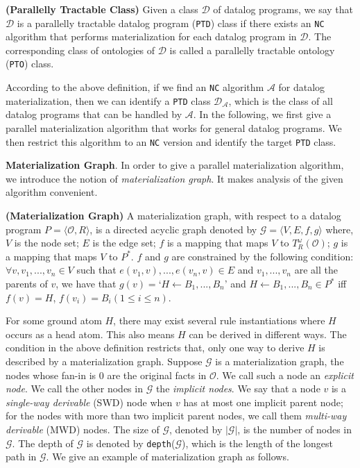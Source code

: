 \documentclass{article}
\begin{document}
\begin{definition}\label{def:ptd}
\textbf{(Parallelly Tractable Class)} Given a class $\mathcal{D}$ of datalog programs,
we say that $\mathcal{D}$ is a parallelly tractable datalog program (\texttt{PTD}) class if there exists an \texttt{NC} algorithm that performs materialization for each datalog program in $\mathcal{D}$. The corresponding class of ontologies of $\mathcal{D}$ is called a parallelly tractable ontology (\texttt{PTO}) class.
\end{definition}

According to the above definition, if we find an \texttt{NC} algorithm $\mathcal{A}$ for datalog materialization, then
we can identify a \texttt{PTD} class $\mathcal{D}_{\mathcal{A}}$, which is the class of all datalog programs
that can be handled by $\mathcal{A}$. In the following, we first give a parallel materialization algorithm that works for general datalog programs. We then restrict this algorithm to an \texttt{NC} version and identify the target \texttt{PTD} class.

\textbf{Materialization Graph}. In order to give a parallel materialization algorithm, we introduce the notion of \emph{materialization graph}. It makes analysis of the given algorithm convenient.

\begin{definition}
\textbf{(Materialization Graph)}\label{def:mg} A materialization graph, with respect to
a datalog program $P=\langle\mathcal{O}, R\rangle$, is a directed acyclic graph
denoted by $\mathcal{G}=\langle V, E, f, g\rangle$ where,$V$ is the node set;
$E$ is the edge set; $f$ is a mapping that maps $V$ to $T_R^{\omega}(\mathcal{O})$;
$g$ is a mapping that maps $V$ to $P^*$. $f$ and $g$ are constrained by the following condition:
$\forall v,v_1,...,v_n\in V$ such that $e(v_1, v),...,e(v_n, v)\in E$ and $v_1,...,v_n$ are all the parents of $v$, we have that $g(v)=$`$H\leftarrow B_1,...,B_n$' and $H\leftarrow B_1,...,B_n\in P^*$ iff $f(v)=H$, $f(v_i)=B_i (1\leq i\leq n)$.
\end{definition}

For some ground atom $H$, there may exist several rule instantiations where $H$ occurs as a head atom. This also means
$H$ can be derived in different ways. The condition in the above definition restricts that, only one way to derive $H$
is described by a materialization graph.
Suppose $\mathcal{G}$ is a materialization graph, the nodes whose fan-in is 0 are the original facts in $\mathcal{O}$. We call such a node an \emph{explicit node}. We call the other nodes in $\mathcal{G}$ the \emph{implicit nodes}. We say that a node
$v$ is a \emph{single-way derivable} (SWD) node when $v$ has at most one implicit parent
node; for the nodes with more than two implicit parent
nodes, we call them \emph{multi-way derivable} (MWD) nodes. The size of $\mathcal{G}$,
denoted by $|\mathcal{G}|$, is the number of nodes in $\mathcal{G}$. The depth of $\mathcal{G}$ is denoted by \texttt{depth}($\mathcal{G}$), which is the length of the longest path in $\mathcal{G}$. We give an example of materialization graph as follows.\\
\end{document}

